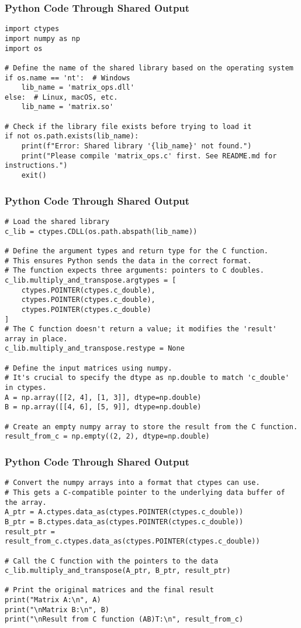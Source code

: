 \documentclass{beamer}
\begin{document}
\begin{frame}[fragile]
\frametitle{Python Code Through Shared Output}
\begin{lstlisting}
import ctypes
import numpy as np
import os

# Define the name of the shared library based on the operating system
if os.name == 'nt':  # Windows
    lib_name = 'matrix_ops.dll'
else:  # Linux, macOS, etc.
    lib_name = 'matrix.so'
    
# Check if the library file exists before trying to load it
if not os.path.exists(lib_name):
    print(f"Error: Shared library '{lib_name}' not found.")
    print("Please compile 'matrix_ops.c' first. See README.md for instructions.")
    exit()
\end{lstlisting}
\end{frame}
\begin{frame}[fragile]
\frametitle{Python Code Through Shared Output}
\begin{lstlisting}
# Load the shared library
c_lib = ctypes.CDLL(os.path.abspath(lib_name))

# Define the argument types and return type for the C function.
# This ensures Python sends the data in the correct format.
# The function expects three arguments: pointers to C doubles.
c_lib.multiply_and_transpose.argtypes = [
    ctypes.POINTER(ctypes.c_double), 
    ctypes.POINTER(ctypes.c_double), 
    ctypes.POINTER(ctypes.c_double)
]
# The C function doesn't return a value; it modifies the 'result' array in place.
c_lib.multiply_and_transpose.restype = None

# Define the input matrices using numpy.
# It's crucial to specify the dtype as np.double to match 'c_double' in ctypes.
A = np.array([[2, 4], [1, 3]], dtype=np.double)
B = np.array([[4, 6], [5, 9]], dtype=np.double)

# Create an empty numpy array to store the result from the C function.
result_from_c = np.empty((2, 2), dtype=np.double)
\end{lstlisting}
\end{frame}
\begin{frame}[fragile]
\frametitle{Python Code Through Shared Output}
\begin{lstlisting}
# Convert the numpy arrays into a format that ctypes can use.
# This gets a C-compatible pointer to the underlying data buffer of the array.
A_ptr = A.ctypes.data_as(ctypes.POINTER(ctypes.c_double))
B_ptr = B.ctypes.data_as(ctypes.POINTER(ctypes.c_double))
result_ptr = result_from_c.ctypes.data_as(ctypes.POINTER(ctypes.c_double))

# Call the C function with the pointers to the data
c_lib.multiply_and_transpose(A_ptr, B_ptr, result_ptr)

# Print the original matrices and the final result
print("Matrix A:\n", A)
print("\nMatrix B:\n", B)
print("\nResult from C function (AB)T:\n", result_from_c)
\end{lstlisting}
\end{frame}
\end{document}
